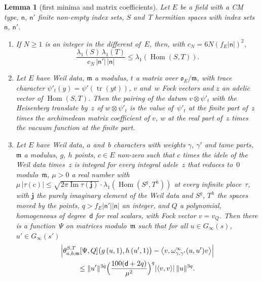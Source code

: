 \documentclass[11pt,a4paper]{article}
\newcommand{\m}[1]{\mbox{$#1$}}        %
\theoremstyle{plainx}
\newtheorem{lemma}[theorem]{Lemma}
\theoremstyle{uprightx}
\newcommand{\ix}[1]{\mathsf{#1}}
\newcommand{\OEr}{\mathfrak{o}_E}
\newcommand{\ip}[2]{\langle #1,#2\rangle}
\newcommand{\tk}[7]{\theta^{#1,#2}_{#3,#4;#5}[#6,#7]}
\begin{document}
\begin{lemma}[first minima and matrix coefficients]\label{l:sparse}
Let $E$ be a field with a CM type, \m{\ix n}, \m{\ix n'} finite non-empty index sets, $S$ and~$T$ hermitian spaces
with index sets \m{\ix n}, \m{\ix n'}.
\begin{enumerate}[label=\textup{(\alph*)},leftmargin=2.3em,itemsep=2pt]
\item If \m{N\ge1} is an integer in the different of~$E$, then, with \m{c_N=6N(f_E|\ix n|)^2},
\[\frac{\lambda_1(S)\,\lambda_1(T)}{c_N\,|\ix n'|\,|\ix n|}\le\lambda_1(\operatorname{Hom}(S,T)).\]
\item Let $E$ have Weil data, $\mathfrak{m}$ a modulus, $t$ a matrix over \m{\OEr/\mathfrak{m}}, with trace character
\m{\psi'_t(y)=\psi'(\operatorname{tr}(yt))}, $v$ and~$w$ Fock vectors and $z$ an adelic vector of
\m{\operatorname{Hom}(S,T)}. Then the pairing of the datum \m{v\otimes\psi'_t} with the Heisenberg translate by~$z$ of
\m{w\otimes\psi'_t} is the value of~$\psi'_t$ at the finite part of~$z$ times the archimedean matrix coefficient of
$v$, $w$ at the real part of~$z$ times the vacuum function at the finite part.
\item Let $E$ have Weil data, $a$ and~$b$ characters with weights $\gamma$, $\gamma'$ and tame parts, $\mathfrak{m}$
a modulus, $g$, $h$ points, \m{c\in E} non-zero such that $c$ times the idele of the Weil data times~$z$ is
integral for every integral adele~$z$ that reduces to~$0$ modulo~$\mathfrak{m}$, \m{\mu>0} a real number with
\m{\mu\,|\tau(c)|\le\sqrt{2\pi\operatorname{Im}\tau(\mathbf{j})}\cdot\lambda_1(\operatorname{Hom}(S^{g},T^{h}))} at every infinite
place~$\tau$, with $\mathbf{j}$ the purely imaginary element of the Weil data and \m{S^{g}}, \m{T^{h}} the spaces moved
by the points, \m{q>f_E|\ix n'||\ix n|} an integer, and $Q$ a polynomial, homogeneous of degree~$\mathsf{d}$ for real
scalars, with Fock vector \m{v=v_Q}. Then there is a function~$\Psi$ on matrices modulo~$\mathfrak{m}$ such that for
all \m{u\in G_\infty(s)}, \m{u'\in G_\infty(s')}
\begin{multline*}
\Bigl|\tk{S}{T}{a}{b}{\mathfrak{m}}{\Psi}{Q}\bigl(g\,(u,1),h\,(u',1)\bigr)-\bigl\langle v,\omega^{\infty}_{\gamma,\gamma'}(u,u')v\bigr\rangle\Bigr|\\
\le\|u'\|^{3q}\Bigl(\frac{100(\mathsf{d}+2q)}{\mu^2}\Bigr)^{q}|\ip{v}{v}|\,\|u\|^{3q}.
\end{multline*}
\end{enumerate}
\end{lemma}
\end{document}

